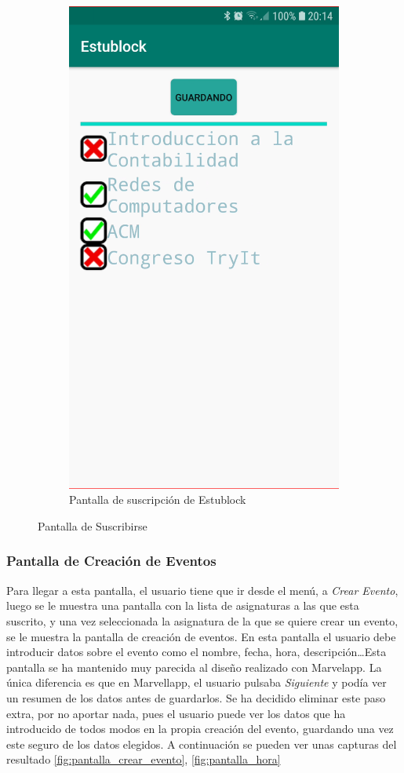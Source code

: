 \begin{figure}[hbt]
\begin{subfigure}[b]{0.4\linewidth}
        \includegraphics[width=0.7\linewidth]{figs/Desarrollo/Interfaz/estublock_asignaturas}
        \caption[Estublock Suscribirse]{Pantalla de suscripción de Estublock}
	\end{subfigure} 
	\caption[Pantalla de Suscribirse]{Pantalla de Suscribirse}
	\label{fig:pantalla_añadir_sus}
\end{figure}

\vspace{1cm}

\subsubsection{Pantalla de Creación de Eventos}

Para llegar a esta pantalla, el usuario tiene que ir desde el menú, a \textit{Crear Evento}, luego se le muestra una pantalla con la lista de asignaturas a las que esta suscrito, y una vez seleccionada la asignatura de la que se quiere crear un evento, se le muestra la pantalla de creación de eventos. En esta pantalla el usuario debe introducir datos sobre el evento como el nombre, fecha, hora, descripción\dots Esta pantalla se ha mantenido muy parecida al diseño realizado con Marvelapp. La única diferencia es que en Marvellapp, el usuario pulsaba \textit{Siguiente} y podía ver un resumen de los datos antes de guardarlos. Se ha decidido eliminar este paso extra, por no aportar nada, pues el usuario puede ver los datos que ha introducido de todos modos en la propia creación del evento, guardando una vez este seguro de los datos elegidos. A continuación se pueden ver unas capturas del resultado \ref{fig:pantalla_crear_evento}, \ref{fig:pantalla_hora}

